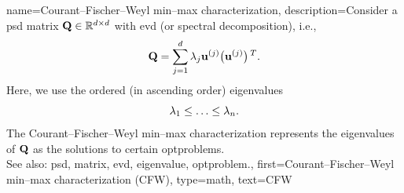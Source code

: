 {name={Courant–Fischer–Weyl min–max characterization}, 
	description={Consider a \gls{psd} 
		\gls{matrix} $\mathbf{Q} \in \mathbb{R}^{d \times d}$ with 
		\gls{evd} (or spectral decomposition), i.e.,
		$$\mathbf{Q} = \sum_{j=1}^{d} \lambda_{j} {\bf u}^{(j)} \big(  {\bf u}^{(j)}  \big)\,^{T}.$$ 
		Here, we use the ordered (in ascending order) \glspl{eigenvalue} 
		\begin{equation}
			\nonumber
		 	\lambda_{1}  \leq \ldots \leq \lambda_{n}. 
		\end{equation}
		The Courant–Fischer–Weyl min–max characterization \cite[Th. 8.1.2]{GolubVanLoanBook} 
		represents the \glspl{eigenvalue} of $\mathbf{Q}$ as the solutions to certain \glspl{optproblem}.
			\\
		See also: \gls{psd}, \gls{matrix}, \gls{evd}, \gls{eigenvalue}, \gls{optproblem}.}, 
	first={Courant–Fischer–Weyl min–max characterization (CFW)}, 
	type=math,
	text={CFW}
}


